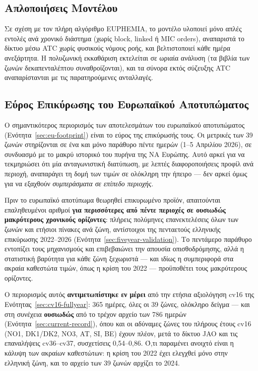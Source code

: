 \subsection{Απλοποιήσεις Μοντέλου}
\label{subsec:model-simplifications}

Σε σχέση με τον πλήρη αλγόριθμο EUPHEMIA, το μοντέλο υλοποιεί μόνο απλές εντολές ανά χρονικό διάστημα (χωρίς block, linked ή MIC orders), αναπαριστά το δίκτυο μέσω ATC χωρίς φυσικούς νόμους ροής, και βελτιστοποιεί κάθε ημέρα ανεξάρτητα. Η πολυζωνική εκκαθάριση εκτελείται σε ωριαία ανάλυση (τα βιβλία των ζωνών δεκαπενταλέπτου συναθροίζονται), και τα σύνορα εκτός σύζευξης ATC αναπαρίστανται με τις παρατηρούμενες ανταλλαγές.

\subsection{Εύρος Επικύρωσης του Ευρωπαϊκού Αποτυπώματος}
\label{subsec:eu-validation-scope}

Ο σημαντικότερος περιορισμός των αποτελεσμάτων του ευρωπαϊκού αποτυπώματος (Ενότητα~\ref{sec:eu-footprint}) είναι το εύρος της επικύρωσής τους. Οι μετρικές των 39 ζωνών στηρίζονται σε ένα και μόνο παράθυρο πέντε ημερών (1--5 Απριλίου 2026), σε συνδυασμό με το μακρύ ιστορικό του πυρήνα της ΝΑ Ευρώπης. Αυτό αρκεί για να τεκμηριώσει ότι μία ανταγωνιστική διατύπωση, με λεπτές διαφοροποιήσεις προφίλ ανά περιοχή, αναπαράγει τη δομή των τιμών σε ολόκληρη την ήπειρο --- δεν αρκεί όμως για να εξαχθούν \emph{συμπεράσματα σε επίπεδο περιοχής}.

Πριν το ευρωπαϊκό αποτύπωμα θεωρηθεί επικυρωμένο προϊόν, απαιτούνται επαληθευμένοι αριθμοί \textbf{για περισσότερες από πέντε περιοχές σε ουσιωδώς μακρύτερους χρονικούς ορίζοντες}: πλήρεις πολύμηνες επανεκτελέσεις όλων των ζωνών και ετήσιοι πίνακες ανά ζώνη, αντίστοιχοι της πενταετούς ελληνικής επικύρωσης 2022--2026 (Ενότητα~\ref{sec:fiveyear-validation}). Το πεντάμερο παράθυρο εντοπίζει τους μηχανισμούς και επιβεβαιώνει την απουσία οπισθοδρόμησης, αλλά η στατιστική βαρύτητα για κάθε ζώνη ξεχωριστά --- και ιδίως η συμπεριφορά στα ακραία καθεστώτα τιμών, όπως η κρίση του 2022 --- προϋποθέτει τους μακρύτερους ορίζοντες.

Ο περιορισμός αυτός \textbf{αντιμετωπίστηκε εν μέρει} από την ετήσια αξιολόγηση cv16 της Ενότητας~\ref{sec:cv16-fullyear}: 365 ημέρες, όλες οι 39 ζώνες, ολόκληρο δείγμα --- και στη συνέχεια \textbf{ουσιωδώς} από το τρέχον αρχείο των 786 ημερών (Ενότητα~\ref{sec:current-record}), όπου και οι αδύναμες ζώνες του πλήρους έτους cv16 (NO1, DK1/DK2, NO3, AT, SI, BE) έχουν πλέον, μετά το δίκτυο JAO και τις επαναλήψεις cv36--cv37, συσχετίσεις 0,54--0,86. Ό,τι παραμένει ανοιχτό είναι η κάλυψη των ακραίων καθεστώτων: η κρίση του 2022 έχει ελεγχθεί μόνο στην ελληνική ζώνη, και το αρχείο των 39 ζωνών αρχίζει το 2024.

